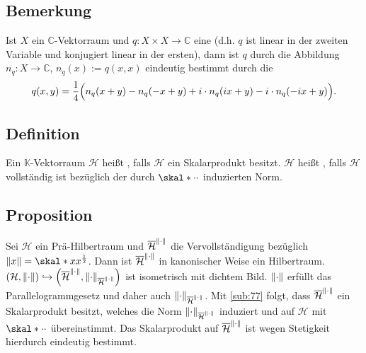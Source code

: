 \subsection[Bemerkung: Polarisierungsidentität]{Bemerkung} %
\label{sub:78}
Ist $X$ ein $\mathds{C}$-Vektorraum und $q \colon X \times X \to \mathds{C}$ eine  (d.h. $q$ ist linear in der zweiten Variable und konjugiert 
linear in der ersten), dann ist $q$ durch die Abbildung $n_q \colon X \to \mathds{C}$, $n_q(x) := q(x,x)$ eindeutig bestimmt durch die 
\[
	q(x,y) = \frac{1}{4} \enbrace[\Big]{n_q(x+y) - n_q(-x+y) + i \cdot n_q(i x +y) - i \cdot n_q(-ix +y)}.  
\]

\subsection[Definition: Prä-Hilbertraum und Hilbertraum]{Definition} %
\label{sub:79}
Ein $\mathds{K}$-Vektorraum $\mathcal{H}$ heißt , falls $\mathcal{H}$ ein Skalarprodukt besitzt. $\mathcal{H}$ heißt , falls
$\mathcal{H}$ vollständig ist bezüglich der durch $\skal*{\cdot}{\cdot}$ induzierten Norm. 

\subsection{Proposition} %
\label{sub:710}
Sei $\mathcal{H}$ ein Prä-Hilbertraum und $\overline{\mathcal{H}}^{\norm{\cdot}}$ die Vervollständigung bezüglich $\norm{x} = \skal*{x}{x}^{\frac{1}{2}}$. Dann ist
$\overline{\mathcal{H}}^{\norm{\cdot}}$ in kanonischer Weise ein Hilbertraum.
$\enbrace*{\mathcal{H}, \norm{\cdot}} \hookrightarrow \enbrace*{\overline{\mathcal{H}}^{\norm{\cdot}}, \norm[\overline{\mathcal{H}}^{\norm{\cdot}}]{\cdot}}$ ist isometrisch
mit dichtem Bild. $\norm{\cdot}$ erfüllt das Parallelogrammgesetz und daher auch $\norm[\overline{\mathcal{H}}^{\norm{\cdot}}]{\cdot}$. Mit \ref{sub:77} folgt, dass 
$\overline{\mathcal{H}}^{\norm{\cdot}}$ ein Skalarprodukt besitzt, welches die Norm $\norm[\overline{\mathcal{H}}^{\norm{\cdot}}]{\cdot}$ induziert und auf $\mathcal{H}$ mit
$\skal*{\cdot}{\cdot}$ übereinstimmt. Das Skalarprodukt auf $\overline{\mathcal{H}}^{\norm{\cdot}}$ ist wegen Stetigkeit hierdurch eindeutig bestimmt. \bewende

